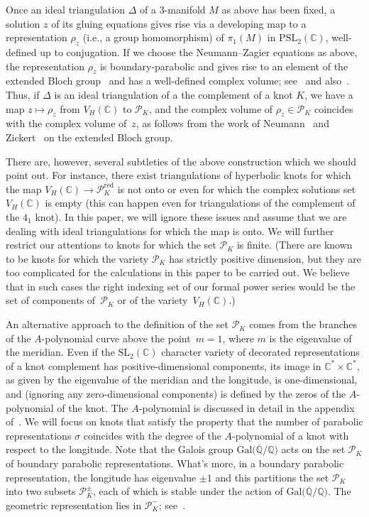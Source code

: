 \documentclass[pdftex]{sigma}
\numberwithin{equation}{section}
\def\BQ{\mathbb Q}
\def\BC{\mathbb C}
\def\calP{\mathcal P}
\def\calP{\mathcal P}
\def\D{\Delta}
\def\SL{\mathrm{SL}}
\def\s{\sigma}
\def\RED{^{\text{red}}}
\begin{document}
Once an ideal triangulation $\D$ of a 3-manifold $M$ as above has been
fixed, a solution $z$ of its gluing equations gives rise via a developing
map to a representation $\rho_z$ (i.e., a group homomorphism) of $\pi_1(M)$
in $\mathrm{PSL}_2(\BC)$, well-defined up to conjugation. If we choose the
Neumann--Zagier equations as above, the representation $\rho_z$ is
boundary-parabolic and gives rise to an element of the extended Bloch
group~\cite{Zickert} and has a well-defined complex volume; see~\cite{Neumann:CS}
and also~\cite{GTZ:complex}. Thus, if $\D$ is an ideal
triangulation of a the complement of a knot $K$, we have a map
$z \mapsto \rho_z$ from $V_H(\BC)$ to $\calP_K$, and the complex volume of
$\rho_z \in \calP_K$ coincides with the complex volume of~$z$, as follows
from the work of Neumann~\cite{Neumann:CS} and Zickert~\cite{Zickert:extended}
on the extended Bloch group.

There are, however, several subtleties of the above construction which
we should point out. For instance, there exist triangulations of hyperbolic knots
for which the map $V_H(\BC)\to\calP\RED_K$ is not onto or even for which the complex
solutions set $V_H(\BC)$ is empty (this can happen even for triangulations of the
complement of the $4_1$ knot). In this paper, we will ignore these issues
and assume that we are dealing with ideal triangulations for which the map
is onto. We will further restrict our attentions to knots for which the
set $\calP_K$ is finite. (There are known to be knots for which the variety
$\calP_K$ has strictly positive dimension, but they are too complicated for
the calculations in this paper to be carried out. We believe that in such
cases the right indexing set of our formal power series would be
the set of components of~$\calP_K$ or of the variety~$V_H(\BC)$.)

An alternative approach to the definition of the set $\calP_K$ comes from the
branches of the $A$-polynomial curve above the point~$m=1$, where $m$
is the eigenvalue of the meridian. Even if the $\SL_2(\BC)$ character variety
of decorated representations of a knot complement has positive-dimensional
components, its image in $\BC^* \times \BC^*$, as given by the eigenvalue
of the meridian and the longitude, is one-dimensional, and (ignoring
any zero-dimensional components) is defined by the zeros of the
$A$-polynomial of the knot. The $A$-polynomial is discussed in detail
in the appendix of~\cite{BDRV}. We will focus on knots that
satisfy the property that the number of parabolic
representations $\s$ coincides with the degree of the $A$-polynomial
of a knot with respect to the longitude. Note that the Galois group
$\text{Gal}\big(\overline{\BQ}/\BQ\big)$ acts on the set $\calP_K$ of boundary
parabolic representations. What's more, in a boundary
parabolic representation, the longitude has eigenvalue $\pm 1$ and this
partitions the set $\calP_K$ into two subsets $\calP^{\pm}_K$,
each of which is stable under the action of $\text{Gal}\big(\overline{\BQ}/\BQ\big)$.
The geometric representation lies in $\calP^{-}_K$;
see~\cite[Lemma~2.2]{Ca:geometric}.
\end{document}

